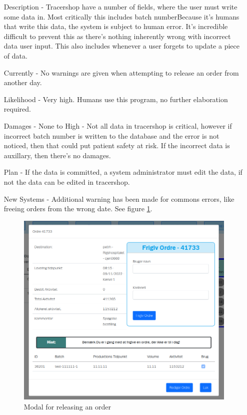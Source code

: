 \documentclass{article}
\begin{document}
\begin{itemize}
  \begin{itemize}
    \item[Description] - Tracershop have a number of fields, where the user must write some data in. Most critically this includes batch numberBecause it's humans that write this data, the system is subject to human error.
    It's incredible difficult to prevent this as there's nothing inherently wrong with \gls{incorrect data} user input. This also includes whenever a user forgets to update a piece of data.
    \item[Currently] - No warnings are given when attempting to release an order from another day.
    \item[Likelihood] - Very high. Humans use this program, no further elaboration required.
    \item[Damages] - None to High - Not all data in tracershop is critical, however if incorrect batch number is written to the database and the error is not noticed, then that could put patient safety at risk. If the incorrect data is auxillary, then there's no damages.
    \item[Plan] - If the data is committed, a system administrator must edit the data, if not the data can be edited in tracershop.
    \item[New Systems] - Additional warning has been made for commons errors, like freeing orders from the wrong date. See figure \ref{fig:dayhint}.

    \begin{figure}[ht]
      \begin{center}
        \includegraphics[width=0.6\linewidth]{figures/DayHint.png}
      \end{center}
      \caption{Modal for releasing an order}
      \label{fig:dayhint}
    \end{figure}


\end{itemize}
\end{itemize}
\end{document}
